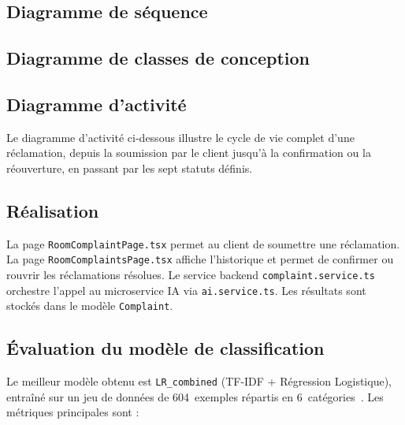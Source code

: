 
\subsection{Diagramme de séquence}

\subsection{Diagramme de classes de conception}

\subsection{Diagramme d'activité}
Le diagramme d'activité ci-dessous illustre le cycle de vie complet d'une réclamation, depuis la soumission par le client jusqu'à la confirmation ou la réouverture, en passant par les sept statuts définis.


\subsection{Réalisation}
La page \texttt{RoomComplaintPage.tsx} permet au client de soumettre une réclamation. La page \texttt{RoomComplaintsPage.tsx} affiche l'historique et permet de confirmer ou rouvrir les réclamations résolues. Le service backend \texttt{complaint.service.ts} orchestre l'appel au microservice IA via \texttt{ai.service.ts}. Les résultats sont stockés dans le modèle \texttt{Complaint}.


\subsection{Évaluation du modèle de classification}
Le meilleur modèle obtenu est \texttt{LR\_combined} (TF-IDF + Régression Logistique), entraîné sur un jeu de données de 604~exemples répartis en 6~catégories~\cite{scikitlearn}. Les métriques principales sont :

